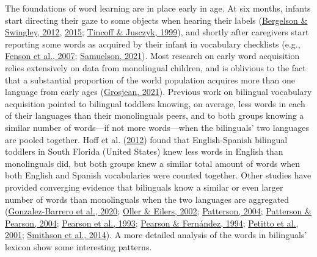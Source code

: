 \documentclass[
]{article}
\begin{document}
The foundations of word learning are in place early in age. At six
months, infants start directing their gaze to some objects when hearing
their labels (\protect\hyperlink{ref-bergelson2012months}{Bergelson \&
Swingley, 2012}, \protect\hyperlink{ref-bergelson2015early}{2015};
\protect\hyperlink{ref-tincoff1999beginnings}{Tincoff \& Jusczyk,
1999}), and shortly after caregivers start reporting some words as
acquired by their infant in vocabulary checklists (e.g.,
\protect\hyperlink{ref-fenson2007macarthurbates}{Fenson et al., 2007};
\protect\hyperlink{ref-samuelson2021precision}{Samuelson, 2021}). Most
research on early word acquisition relies extensively on data from
monolingual children, and is oblivious to the fact that a substantial
proportion of the world population acquires more than one language from
early ages (\protect\hyperlink{ref-grosjean2021extent}{Grosjean, 2021}).
Previous work on bilingual vocabulary acquisition pointed to bilingual
toddlers knowing, on average, less words in each of their languages than
their monolinguals peers, and to both groups knowing a similar number of
words---if not more words---when the bilinguals' two languages are
pooled together. Hoff et al.
(\protect\hyperlink{ref-hoff2012dual}{2012}) found that English-Spanish
bilingual toddlers in South Florida (United States) knew less words in
English than monolinguals did, but both groups knew a similar total
amount of words when both English and Spanish vocabularies were counted
together. Other studies have provided converging evidence that
bilinguals know a similar or even larger number of words than
monolinguals when the two languages are aggregated
(\protect\hyperlink{ref-gonzalez-barrero2020bilingual}{Gonzalez-Barrero
et al., 2020}; \protect\hyperlink{ref-oller2002language}{Oller \&
Eilers, 2002}; \protect\hyperlink{ref-patterson2004comparing}{Patterson,
2004}; \protect\hyperlink{ref-patterson2004bilingual}{Patterson \&
Pearson, 2004}; \protect\hyperlink{ref-pearson1993lexical}{Pearson et
al., 1993}; \protect\hyperlink{ref-pearson1994patterns}{Pearson \&
Fernández, 1994}; \protect\hyperlink{ref-petitto2001bilingual}{Petitto
et al., 2001}; \protect\hyperlink{ref-smithson2014bilingualism}{Smithson
et al., 2014}). A more detailed analysis of the words in bilinguals'
lexicon show some interesting patterns.
\end{document}
